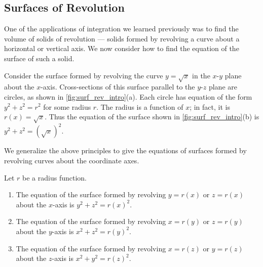 \subsection{Surfaces of Revolution}

One of the applications of integration we learned previously was to find the volume of solids of revolution --- solids formed by revolving a curve about a horizontal or vertical axis. We now consider how to find the equation of the surface of such a solid.


Consider the surface formed by revolving the curve $y=\sqrt{x}$ in the $x$-$y$ plane about the $x$-axis. Cross-sections of this surface parallel to the $y$-$z$ plane are circles, as shown in \autoref{fig:surf_rev_intro}(a). Each circle has equation of the form $y^2+z^2=r^2$ for some radius $r$. The radius is a function of $x$; in fact, it is $r(x) = \sqrt{x}$. Thus the equation of the surface shown in \autoref{fig:surf_rev_intro}(b) is $y^2+z^2=(\sqrt{x})^2.$

We generalize the above principles to give the equations of surfaces formed by revolving curves about the coordinate axes.

\begin{keyidea}\label{idea:surf_of_revol}%
Let $r$ be a radius function. 
\begin{enumerate}
	\item The equation of the surface formed by revolving $y=r(x)$ or $z=r(x)$ about the $x$-axis is $y^2+z^2=r(x)^2$.
	\item The equation of the surface formed by revolving $x=r(y)$ or $z=r(y)$ about the $y$-axis is $x^2+z^2=r(y)^2$.
	\item The equation of the surface formed by revolving $x=r(z)$ or $y=r(z)$ about the $z$-axis is $x^2+y^2=r(z)^2$.
\end{enumerate}
\end{keyidea}

